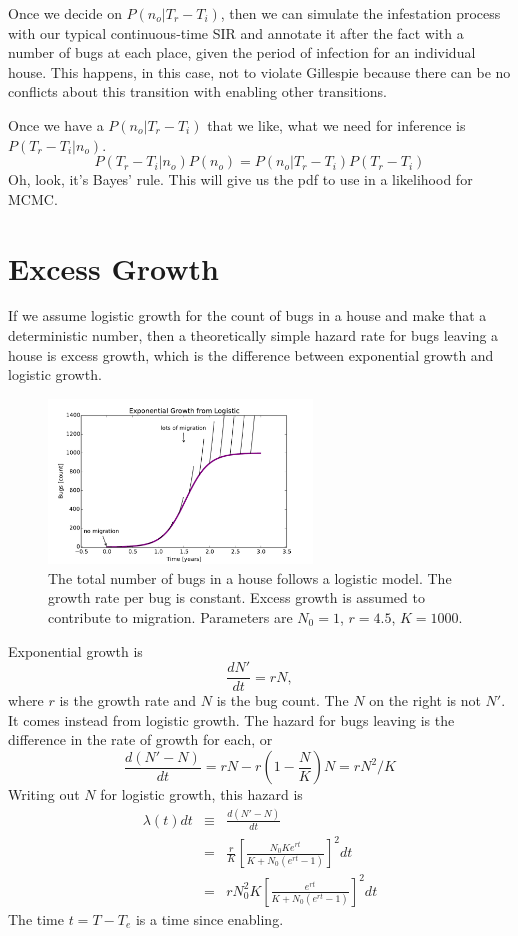 \documentclass{article}
\begin{document}
Once we decide on $P(n_o|T_r-T_i)$, then we can simulate the
infestation process with our typical continuous-time SIR
and annotate it after the fact with a number of bugs at each place,
given the period of infection for an individual house.
This happens, in this case, not to violate Gillespie because there
can be no conflicts about this transition with enabling other
transitions.

Once we have a $P(n_o|T_r-T_i)$ that we like, what we need for
inference is $P(T_r-T_i|n_o)$.
\begin{equation}
  P(T_r-T_i|n_o)P(n_o)=P(n_o|T_r-T_i)P(T_r-T_i)
\end{equation}
Oh, look, it's Bayes' rule. This will give us the pdf to use
in a likelihood for MCMC.


\section{Excess Growth}
If we assume logistic growth for the count of bugs in a house
and make that a deterministic number, then a theoretically
simple hazard rate for bugs leaving a house is excess growth,
which is the difference between exponential growth and logistic growth.

\begin{figure}
\centerline{\includegraphics[width=7cm]{excess}}
\caption{The total number of bugs in a house follows
a logistic model. The growth rate per bug is constant.
Excess growth is assumed to contribute to migration.
Parameters are $N_0=1$, $r=4.5$, $K=1000.$\label{fig:excessslopes}}
\end{figure}

Exponential growth is
\begin{equation}
  \frac{dN'}{dt}=rN,
\end{equation}
where $r$ is the growth rate and $N$ is the bug count.
The $N$ on the right is not $N'$. It comes instead from logistic
growth. The hazard for bugs leaving is the difference in the
rate of growth for each, or
\begin{equation}
  \frac{d(N'-N)}{dt}=rN-r\left(1-\frac{N}{K}\right)N=rN^2/K
\end{equation}
Writing out $N$ for logistic growth, this hazard is
\begin{eqnarray}
  \lambda(t)dt&\equiv & \frac{d(N'-N)}{dt} \\
  & = & \frac{r}{K}\left[
  \frac{N_0Ke^{rt}}{K+N_0(e^{rt}-1)}\right]^2dt \\
  &=&rN_0^2K\left[
    \frac{e^{rt}}{K+N_0(e^{rt}-1)}\right]^2dt
\end{eqnarray}
The time $t=T-T_e$ is a time since enabling.
\end{document}
